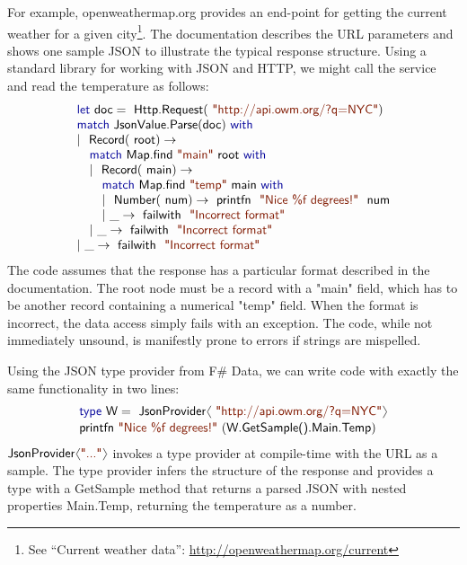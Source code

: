 \documentclass[10pt,preprint,blind,clearpagebib]{sigplanconf}
\newcommand{\langl}{\begin{picture}(4.5,7)
\put(1.1,2.5){\rotatebox{60}{\line(1,0){5.5}}}
\put(1.1,2.5){\rotatebox{300}{\line(1,0){5.5}}}
\end{picture}}
\newcommand{\rangl}{\begin{picture}(4.5,7)
\put(.9,2.5){\rotatebox{120}{\line(1,0){5.5}}}
\put(.9,2.5){\rotatebox{240}{\line(1,0){5.5}}}
\end{picture}}
\newcommand{\kvd}[1]{\textnormal{\textcolor{kvdclr}{\sffamily #1}}}
\newcommand{\str}[1]{\textnormal{\textcolor{strclr}{\sffamily "#1"}}}
\newcommand{\ident}[1]{\textnormal{\sffamily #1}}
\begin{document}
For example, openweathermap.org provides an end-point for getting the current weather for a 
given city\footnote{See ``Current weather data'': \url{http://openweathermap.org/current}}. 
The documentation describes the URL parameters and shows one sample JSON to illustrate the typical
response structure. Using a standard library for working with JSON and HTTP, we might call the 
service and read the temperature as follows:
%
\begin{equation*}
\begin{array}{l}
 \kvd{let}~\ident{doc}=\ident{Http.Request}(\str{http://api.owm.org/?q=NYC}) \\
 \kvd{match}~\ident{JsonValue.Parse}(\ident{doc})~\kvd{with} \\
 |~\ident{Record}(\ident{root})\rightarrow \\
 \quad \kvd{match}~\ident{Map.find}~\str{main}~\ident{root}~\kvd{with} \\
 \quad |~\ident{Record}(\ident{main})\rightarrow \\
 \quad \quad \kvd{match}~\ident{Map.find}~\str{temp}~\ident{main}~\kvd{with} \\
 \quad \quad |~\ident{Number}(\ident{num})\rightarrow \ident{printfn}~\str{Nice \%f degrees!}~\ident{num} \\
 \quad \quad |~\_\rightarrow \ident{failwith}~\str{Incorrect format} \\
 \quad |~\_\rightarrow \ident{failwith}~\str{Incorrect format} \\
 |~\_\rightarrow \ident{failwith}~\str{Incorrect format} 
\end{array}
\end{equation*}
%
The code assumes that the response has a particular format described in the documentation. The
root node must be a record with a \str{main} field, which has to be another record containing
a numerical \str{temp} field. When the format is incorrect, the data access simply fails
with an exception. The code, while not immediately unsound, is manifestly prone to errors if
strings are mispelled.

Using the JSON type provider from F\# Data, we can write code with exactly the 
same functionality in two lines:
%
\begin{equation*}
\begin{array}{l}
 \kvd{type}~\ident{W} = \ident{JsonProvider}\langl\str{http://api.owm.org/?q=NYC}\rangl \\[0.1em]
 \ident{printfn}~\str{Nice \%f degrees!}~(\ident{W.GetSample().Main.Temp})
\end{array}
\end{equation*}
%
$\ident{JsonProvider}\langl\str{...}\rangl$ invokes a type provider at 
compile-time with the URL as a sample. The type provider infers the structure of the response
and provides a type with a \ident{GetSample} method that returns a parsed JSON with nested
properties \ident{Main.Temp}, returning the temperature as a number. 
\end{document}
